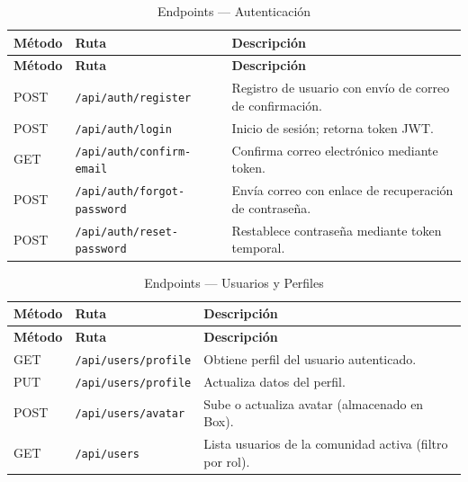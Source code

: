 \begin{longtable}{|p{}|p{}|p{}|}
\caption{Endpoints --- Autenticación}\label{tab:ep-auth}\\
\hline
\textbf{Método} & \textbf{Ruta} & \textbf{Descripción} \\
\hline
\endfirsthead
\hline \textbf{Método} & \textbf{Ruta} & \textbf{Descripción} \\ \hline
\endhead
\hline \endfoot

POST & \texttt{/api/auth/register} & Registro de usuario con envío de correo de confirmación. \\
\hline
POST & \texttt{/api/auth/login} & Inicio de sesión; retorna token JWT. \\
\hline
GET & \texttt{/api/auth/confirm-email} & Confirma correo electrónico mediante token. \\
\hline
POST & \texttt{/api/auth/forgot-password} & Envía correo con enlace de recuperación de contraseña. \\
\hline
POST & \texttt{/api/auth/reset-password} & Restablece contraseña mediante token temporal. \\

\end{longtable}

\begin{longtable}{|p{}|p{}|p{}|}
\caption{Endpoints --- Usuarios y Perfiles}\label{tab:ep-users}\\
\hline
\textbf{Método} & \textbf{Ruta} & \textbf{Descripción} \\
\hline
\endfirsthead
\hline \textbf{Método} & \textbf{Ruta} & \textbf{Descripción} \\ \hline
\endhead
\hline \endfoot

GET & \texttt{/api/users/profile} & Obtiene perfil del usuario autenticado. \\
\hline
PUT & \texttt{/api/users/profile} & Actualiza datos del perfil. \\
\hline
POST & \texttt{/api/users/avatar} & Sube o actualiza avatar (almacenado en Box). \\
\hline
GET & \texttt{/api/users} & Lista usuarios de la comunidad activa (filtro por rol). \\

\end{longtable}

